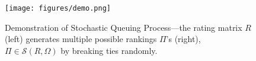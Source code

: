 \documentclass{article}
\begin{document}


\begin{figure}[ht]
\vspace{-0.1in}
\begin{center}
\centerline{\texttt{[image: figures/demo.png]}}
\caption{Demonstration of Stochastic Queuing Process---the rating matrix $R$ (left) generates multiple possible rankings $\Pi$'s (right), $\Pi \in \mathcal S(R,\Omega)$ by breaking ties randomly.}
\label{demo}
\end{center}
\vskip -0.3in
\end{figure}
\end{document}
